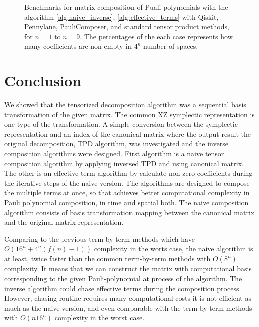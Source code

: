 \documentclass[twocolumn]{article}
\begin{document}
\begin{figure}[ht]
    \caption{Benchmarks for matrix composition of Puali polynomials with the algorithm \ref{alg:naive_inverse}, \ref{alg:effective_terms} with 
    Qiskit, Pennylane, PauliComposer, and standard tensor product methods, for $n=1$ to $n=9$. 
    The percentages of the each case represents how many coefficients are non-empty in $4^n$ number of spaces.}
        \label{fig:results}
\end{figure}

\section{Conclusion}
We showed that the tensorized decomposition algorithm was a 
sequential basis transformation of the given matrix.
The common XZ symplectic representation is one type of the transformation.
A simple conversion between the symplectic representation and an index of the canonical matrix 
where the output result the original decomposition, TPD algorithm\cite{Hantzko_2024}, 
was investigated and the inverse composition algorithms were designed. 
First algorithm is a naive tensor composition algorithm by applying inversed TPD and using canonical matrix.
The other is an effective term algorithm by calculate non-zero coefficients during the iterative 
steps of the naive version.
The algorithms are designed to compose the multiple terms at once, 
so that achieves better computational complexity in Pauli polynomial composition, in time and spatial both. 
The naive composition algorithm consists of basis transformation mapping between 
the canonical matrix and the original matrix representation.

Comparing to the previous term-by-term methods which have $O(16^n + 4^n(f(n)-1))$ complexity in the worts case, 
the naive algorithm is at least, twice faster than the common term-by-term methods  with $O(8^n)$ complexity. 
It means that we can construct the matrix with computational basis corresponding to the given 
Pauli-polynomial at process of the algorithm. 
The inverse algorithm could chase effective terms during the composition process. 
However, chasing routine requires many computational costs it is not efficient as much as the naive version,
and even comparable with the term-by-term methods with $O(n16^n)$ complexity in the worst case.
\end{document}

